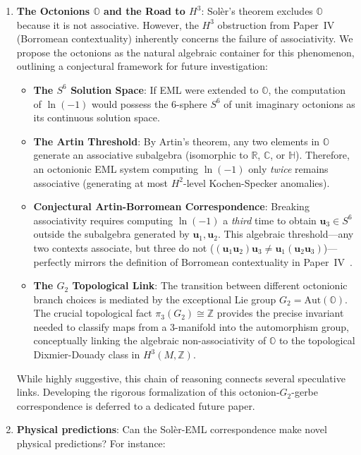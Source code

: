 \documentclass[11pt]{article}
\providecommand{\tightlist}{%
  \setlength{\itemsep}{0pt}\setlength{\parskip}{0pt}}
\begin{document}
\begin{enumerate}
\def\labelenumi{\arabic{enumi}.}
\item
  \textbf{The Octonions $\mathbb{O}$ and the Road to $H^3$}: Sol\`{e}r's theorem excludes $\mathbb{O}$ because it is not associative. However, the $H^3$ obstruction from Paper~IV~\cite{PaperIV} (Borromean contextuality) inherently concerns the failure of associativity. We propose the octonions as the natural algebraic container for this phenomenon, outlining a conjectural framework for future investigation:

  \begin{itemize}
  \tightlist
  \item
    \textbf{The $S^6$ Solution Space}: If EML were extended to $\mathbb{O}$, the computation of $\ln(-1)$ would possess the 6-sphere $S^6$ of unit imaginary octonions as its continuous solution space.
  \item
    \textbf{The Artin Threshold}: By Artin's theorem, any two elements in $\mathbb{O}$ generate an associative subalgebra (isomorphic to $\mathbb{R}$, $\mathbb{C}$, or $\mathbb{H}$). Therefore, an octonionic EML system computing $\ln(-1)$ only \emph{twice} remains associative (generating at most $H^2$-level Kochen-Specker anomalies).
  \item
    \textbf{Conjectural Artin-Borromean Correspondence}: Breaking associativity requires computing $\ln(-1)$ a \emph{third} time to obtain $\mathbf{u}_3 \in S^6$ outside the subalgebra generated by $\mathbf{u}_1, \mathbf{u}_2$. This algebraic threshold---any two contexts associate, but three do not ($(\mathbf{u}_1\mathbf{u}_2)\mathbf{u}_3 \neq \mathbf{u}_1(\mathbf{u}_2\mathbf{u}_3)$)---perfectly mirrors the definition of Borromean contextuality in Paper~IV~\cite{PaperIV}.
  \item
    \textbf{The $G_2$ Topological Link}: The transition between different octonionic branch choices is mediated by the exceptional Lie group $G_2 = \mathrm{Aut}(\mathbb{O})$. The crucial topological fact $\pi_3(G_2) \cong \mathbb{Z}$ provides the precise invariant needed to classify maps from a 3-manifold into the automorphism group, conceptually linking the algebraic non-associativity of $\mathbb{O}$ to the topological Dixmier-Douady class in $H^3(M, \mathbb{Z})$.
  \end{itemize}

  While highly suggestive, this chain of reasoning connects several speculative links. Developing the rigorous formalization of this octonion-$G_2$-gerbe correspondence is deferred to a dedicated future paper.
  \item
  \textbf{Physical predictions}: Can the Solèr-EML correspondence make novel physical predictions? For instance:


\end{enumerate}
\end{document}
